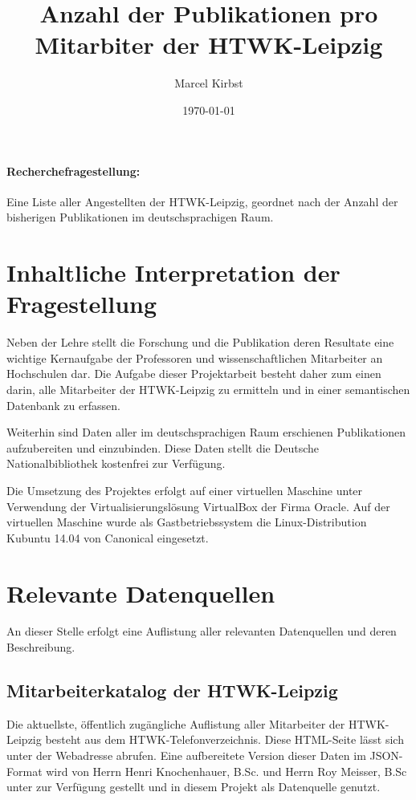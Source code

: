 \documentclass[parskip]{scrartcl}
\begin{document}
\subject{Projektdokumentation im Modul Semantic Web}
\title{Anzahl der Publikationen pro Mitarbiter der HTWK-Leipzig}
\author{Marcel Kirbst}
\date{\today}

\maketitle


\paragraph{Recherchefragestellung: }
Eine Liste aller Angestellten der HTWK-Leipzig, geordnet nach der Anzahl der bisherigen Publikationen im deutschsprachigen Raum.

\section{Inhaltliche Interpretation der Fragestellung}

Neben der Lehre stellt die Forschung und die Publikation deren Resultate eine wichtige Kernaufgabe der Professoren und wissenschaftlichen Mitarbeiter an Hochschulen dar. 
Die Aufgabe dieser Projektarbeit besteht daher zum einen darin, alle Mitarbeiter der HTWK-Leipzig zu ermitteln und in einer semantischen Datenbank zu erfassen. 

Weiterhin sind Daten aller im deutschsprachigen Raum erschienen Publikationen aufzubereiten und einzubinden. Diese Daten stellt die Deutsche Nationalbibliothek kostenfrei zur Verfügung.

Die Umsetzung des Projektes erfolgt auf einer virtuellen Maschine unter Verwendung der Virtualisierungslösung VirtualBox der Firma Oracle. Auf der virtuellen Maschine wurde als Gastbetriebssystem die Linux-Distribution Kubuntu 14.04 von Canonical eingesetzt. 

\section{Relevante Datenquellen}

An dieser Stelle erfolgt eine Auflistung aller relevanten Datenquellen und deren Beschreibung.

\subsection{Mitarbeiterkatalog der HTWK-Leipzig}

Die aktuellste, öffentlich zugängliche Auflistung aller Mitarbeiter der HTWK-Leipzig besteht aus dem HTWK-Telefonverzeichnis. Diese HTML-Seite lässt sich unter der Webadresse \cite{htwktel} abrufen.
Eine aufbereitete Version dieser Daten im JSON-Format wird von Herrn Henri Knochenhauer, B.Sc. und Herrn Roy Meisser, B.Sc unter \cite{htwkteljson} zur Verfügung gestellt und in diesem Projekt als Datenquelle genutzt.
\end{document}
